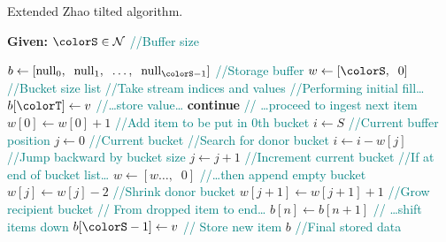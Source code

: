 \begin{algorithm}[H]
\caption{Extended Zhao tilted algorithm.}
\label{alg:zhao-tilted-full}
\begin{minipage}{0.5\textwidth}
    \hspace*{\algorithmicindent} \textbf{Given:} $\colorS \in \mathcal{N}$ \textcolor{teal}{\small//Buffer size}
    \hspace*{\algorithmicindent}    \begin{algorithmic}[1]
        \State $b \gets [\mathrm{null}_0,\;\; \mathrm{null}_1, \;\; \ldots, \;\; \mathrm{null}_{\colorS - 1}]$ \textcolor{teal}{\small//Storage buffer}
        \State $w \gets [\colorS, \;\; 0]$ \textcolor{teal}{\small//Bucket size list}
         \textcolor{teal}{\small//Take stream indices and values}
         \textcolor{teal}{\small//Performing initial fill\ldots}
        \State $b[\colorT] \gets v$ \textcolor{teal}{\small//\ldots store value\ldots}
        \State \textbf{continue} \textcolor{teal}{\small// \ldots proceed to ingest next item}
        \EndIf
        \State $w[0] \gets w[0] + 1$  \textcolor{teal}{\small//Add item to be put in 0th bucket}
        \State $i \gets S$ \textcolor{teal}{\small//Current buffer position}
        \State $j \gets 0$ \textcolor{teal}{\small//Current bucket}
         \textcolor{teal}{\small//Search for donor bucket}
        \State $i \gets i - w[j]$ \textcolor{teal}{\small//Jump backward by bucket size}
        \State $j \gets j + 1$ \textcolor{teal}{\small//Increment current bucket}
         \textcolor{teal}{\small//If at end of bucket list\ldots}
        \State $w \gets [w\ldots,\;\; 0]$ \textcolor{teal}{\small//\ldots then append empty bucket}
        \EndIf
        \EndWhile
        \State $w[j] \gets w[j] - 2$ \textcolor{teal}{\small //Shrink donor bucket}
        \State $w[j + 1] \gets w[j + 1] + 1$ \textcolor{teal}{\small //Grow recipient bucket}
        \For{$n \in [i - w[j] \twodots \colorS - 1)$} \textcolor{teal}{\small//
        From dropped item to end\ldots}
        \State $b[n] \gets b[n + 1]$ \textcolor{teal}{\small// \ldots shift items down}
        \EndFor
        \State $b[\colorS - 1] \gets v$ \textcolor{teal}{\small// Store new item}
        \EndFor
        \Return $b$ \textcolor{teal}{\small//Final stored data}
    \end{algorithmic}
\end{minipage}
\end{algorithm}
